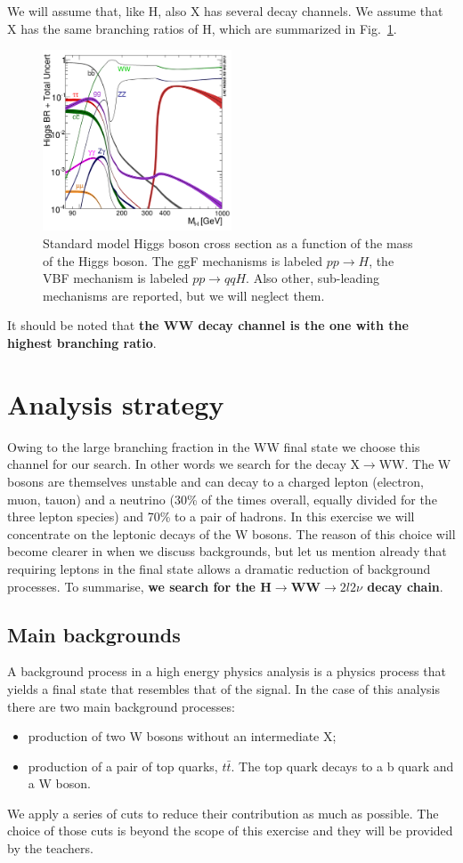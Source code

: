 \documentclass[a4paper,12pt]{article}
\begin{document}
 We will assume that, like H, also X has several decay channels. We assume that X has the same branching ratios of H, which are summarized in Fig.~\ref{fig:br}.
\begin{figure}
 \centering 
 \includegraphics[width=0.5\textwidth]{images/Higgs_BR.png}
 \caption{Standard model Higgs boson cross section as a function of the mass of the Higgs boson. The ggF mechanisms is labeled $pp\rightarrow{}H$, the VBF mechanism is labeled $pp\rightarrow{}qqH$. Also other, sub-leading mechanisms are reported, 
 but we will neglect them.\label{fig:br}}
\end{figure}
It should be noted that {\bf the WW decay channel is the one with the highest branching ratio}.

\section{Analysis strategy}
Owing to the large branching fraction in the WW final state we choose this
channel for our search. In other words we search for the decay
X$\rightarrow$WW. The W bosons are themselves unstable and can decay
to a charged lepton (electron, muon, tauon) and a neutrino (30\% of the times
overall, equally divided for the three lepton species) and 70\% to a pair of
hadrons. In this exercise we will concentrate on the leptonic decays of the W
bosons. The reason of this choice will become clearer in when we discuss
backgrounds, but let us mention already that requiring leptons in the final
state allows a dramatic reduction of background processes. 
To summarise, {\bf we search for the H$\rightarrow$WW$\rightarrow{}2l2\nu$ decay
chain}.

\subsection{Main backgrounds}
A background process in a high energy physics analysis is a physics process
that yields a final state that resembles that of the signal.
In the case of this analysis there are two main background processes:
\begin{itemize}
\item production of two W bosons without an intermediate X;
\item production of a pair of top quarks, $t\bar{t}$. The top quark decays to
a b quark and a W boson.
\end{itemize}

We apply a series of cuts to reduce their contribution as much as possible.
The choice of those cuts is beyond the scope of this exercise and they will be
provided by the teachers.
\end{document}
